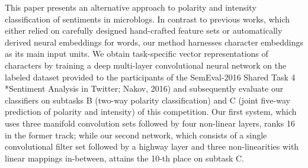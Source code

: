 This paper presents an alternative approach to polarity and intensity classification of sentiments in microblogs.  In contrast to previous works, which either relied on carefully designed hand-crafted feature sets or automatically derived neural embeddings for words, our method harnesses character embeddings as its main input units.  We obtain task-specific vector representations of characters by training a deep multi-layer convolutional neural network on the labeled dataset provided to the participants of the SemEval-2016 Shared Task 4 *Sentiment Analysis in Twitter; Nakov, 2016) and subsequently evaluate our classifiers on subtasks B (two-way polarity classification) and C (joint five-way prediction of polarity and intensity) of this competition.  Our first system, which uses three manifold convolution sets followed by four non-linear layers, ranks 16 in the former track; while our second network, which consists of a single convolutional filter set followed by a highway layer and three non-linearities with linear mappings in-between, attains the 10-th place on subtask C.
